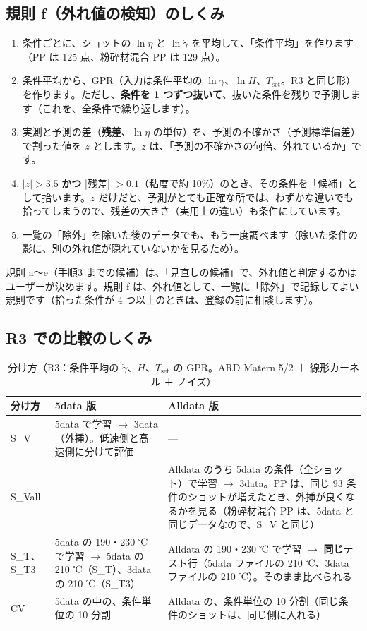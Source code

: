 \documentclass[paper=a4paper,fontsize=10.5pt,line_length=44zw,number_of_lines=38]{jlreq}
\newcommand{\gd}{\dot{\gamma}}
\newcommand{\Tset}{T_{\mathrm{set}}}
\begin{document}
\subsection{規則 f（外れ値の検知）のしくみ}
\begin{enumerate}[itemsep=0.4ex,topsep=0.5ex]
\item 条件ごとに、ショットの $\ln\eta$ と $\ln\gd$ を平均して、「条件平均」を作ります（PP は 125 点、粉砕材混合 PP は 129 点）。
\item 条件平均から、GPR（入力は条件平均の $\ln\gd$、$\ln H$、$\Tset$。R3 と同じ形）を作ります。ただし、\textbf{条件を 1 つずつ抜いて}、抜いた条件を残りで予測します（これを、全条件で繰り返します）。
\item 実測と予測の差（\textbf{残差}、$\ln\eta$ の単位）を、予測の不確かさ（予測標準偏差）で割った値を \textbf{$z$} とします。$z$ は、「予測の不確かさの何倍、外れているか」です。
\item $|z|>3.5$ \textbf{かつ} |残差| $>0.1$（粘度で約 10\%）のとき、その条件を「候補」として拾います。$z$ だけだと、予測がとても正確な所では、わずかな違いでも拾ってしまうので、残差の大きさ（実用上の違い）も条件にしています。
\item 一覧の「除外」を除いた後のデータでも、もう一度調べます（除いた条件の影に、別の外れ値が隠れていないかを見るため）。
\end{enumerate}
規則 a〜e（手順3 までの候補）は、「見直しの候補」で、外れ値と判定するかはユーザーが決めます。規則 f は、外れ値として、一覧に「除外」で記録してよい規則です（拾った条件が 4 つ以上のときは、登録の前に相談します）。

\subsection{R3 での比較のしくみ}
\begin{table}[H]
\caption{分け方（R3：条件平均の $\gd$、$H$、$\Tset$ の GPR。ARD Matern 5/2 ＋ 線形カーネル ＋ ノイズ）}
\begin{tabularx}{\linewidth}{@{}l>{\raggedright\arraybackslash}p{9\zw}>{\raggedright\arraybackslash}X@{}}
\toprule
分け方 & 5data 版 & Alldata 版 \\
\midrule
S\_V & 5data で学習 $\to$ 3data（外挿）。低速側と高速側に分けて評価 & --- \\
S\_Vall & --- & Alldata のうち 5data の条件（全ショット）で学習 $\to$ 3data。PP は、同じ 93 条件のショットが増えたとき、外挿が良くなるかを見る（粉砕材混合 PP は、5data と同じデータなので、S\_V と同じ） \\
S\_T、S\_T3 & 5data の 190・230 ℃ で学習 $\to$ 5data の 210 ℃（S\_T）、3data の 210 ℃（S\_T3） & Alldata の 190・230 ℃ で学習 $\to$ \textbf{同じ}テスト行（5data ファイルの 210 ℃、3data ファイルの 210 ℃）。そのまま比べられる \\
CV & 5data の中の、条件単位の 10 分割 & Alldata の、条件単位の 10 分割（同じ条件のショットは、同じ側に入れる） \\
\bottomrule
\end{tabularx}
\end{table}
\end{document}
